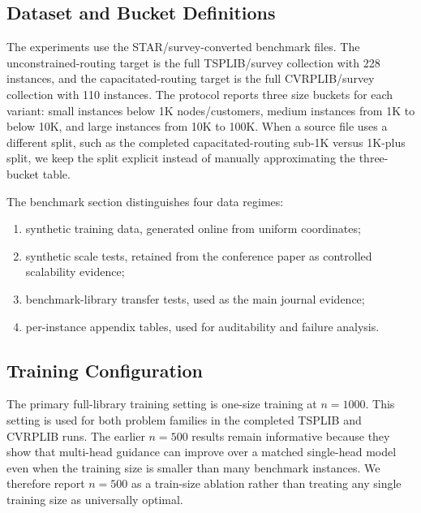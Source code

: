 \documentclass[11pt]{article}
\begin{document}
\subsection{Dataset and Bucket Definitions}
\label{sec:datasets}

The experiments use the STAR/survey-converted benchmark files.
The unconstrained-routing target is the full TSPLIB/survey collection with 228 instances, and the capacitated-routing target is the full CVRPLIB/survey collection with 110 instances.
The protocol reports three size buckets for each variant: small instances below 1K nodes/customers, medium instances from 1K to below 10K, and large instances from 10K to 100K.
When a source file uses a different split, such as the completed capacitated-routing sub-1K versus 1K-plus split, we keep the split explicit instead of manually approximating the three-bucket table.

The benchmark section distinguishes four data regimes:
\begin{enumerate}
    \item synthetic training data, generated online from uniform coordinates;
    \item synthetic scale tests, retained from the conference paper as controlled scalability evidence;
    \item benchmark-library transfer tests, used as the main journal evidence;
    \item per-instance appendix tables, used for auditability and failure analysis.
\end{enumerate}

\subsection{Training Configuration}
\label{sec:training-config}

The primary full-library training setting is one-size training at $n=1000$.
This setting is used for both problem families in the completed TSPLIB and CVRPLIB runs.
The earlier $n=500$ results remain informative because they show that multi-head guidance can improve over a matched single-head model even when the training size is smaller than many benchmark instances.
We therefore report $n=500$ as a train-size ablation rather than treating any single training size as universally optimal.
\end{document}

